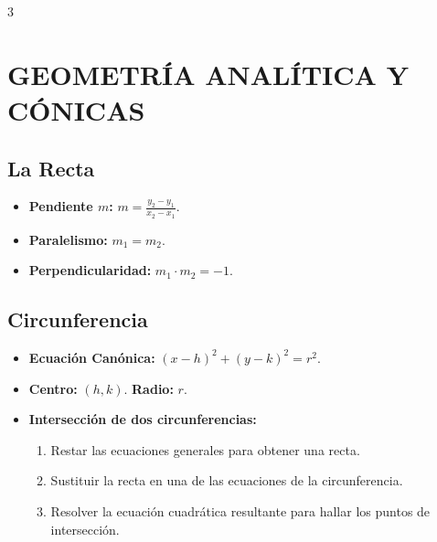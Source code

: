 \documentclass[8pt,letterpaper]{article}
\begin{document}
\begin{multicols*}{3}

\section*{GEOMETRÍA ANALÍTICA Y CÓNICAS}

\subsection*{La Recta}
\begin{itemize}
    \item \textbf{Pendiente $m$:} $m = \frac{y_2 - y_1}{x_2 - x_1}$.
    \item \textbf{Paralelismo:} $m_1 = m_2$.
    \item \textbf{Perpendicularidad:} $m_1 \cdot m_2 = -1$.
\end{itemize}

\subsection*{Circunferencia}
\begin{itemize}
    \item \textbf{Ecuación Canónica:} $(x-h)^2 + (y-k)^2 = r^2$.
    \item \textbf{Centro:} $(h, k)$. \textbf{Radio:} $r$.
    \item \textbf{Intersección de dos circunferencias:}
    \begin{enumerate}[label=\arabic*.]
        \item Restar las ecuaciones generales para obtener una recta.
        \item Sustituir la recta en una de las ecuaciones de la circunferencia.
        \item Resolver la ecuación cuadrática resultante para hallar los puntos de intersección.
    \end{enumerate}
\end{itemize}


\end{multicols*}
\end{document}
